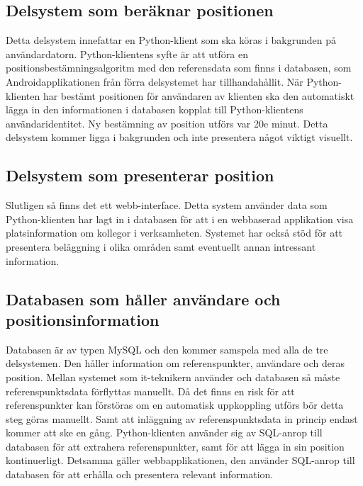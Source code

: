 \documentclass[swedish, a4paper,12pt]{article}
\begin{document}
\subsection{Delsystem som beräknar positionen}
Detta delsystem innefattar en Python-klient som ska köras i bakgrunden på användardatorn. Python-klientens syfte är att utföra en positionsbestämningsalgoritm med den referensdata som finns i databasen, som Androidapplikationen från förra delsystemet har tillhandahållit. När Python-klienten har bestämt positionen för användaren av klienten ska den automatiskt lägga in den informationen i databasen kopplat till Python-klientens användaridentitet. Ny bestämning av position utförs var 20e minut. Detta delsystem kommer ligga i bakgrunden och inte presentera något viktigt visuellt.

\subsection{Delsystem som presenterar position}
Slutligen så finns det ett webb-interface. Detta system använder data som Python-klienten har lagt in i databasen för att i en webbaserad applikation visa platsinformation om kollegor i verksamheten. Systemet har också stöd för att presentera beläggning i olika områden samt eventuellt annan intressant information.

\subsection{Databasen som håller användare och positionsinformation}
Databasen är av typen MySQL och den kommer samspela med alla de tre delsystemen. Den håller information om referenspunkter, användare och deras position.
Mellan systemet som it-teknikern använder och databasen så måste referenspunktsdata förflyttas manuellt. Då det finns en risk för att referenspunkter kan förstöras om en automatisk uppkoppling utförs bör detta steg göras manuellt. Samt att inläggning av referenspunktsdata in princip endast kommer att ske en gång. Python-klienten använder sig av SQL-anrop till databasen för att extrahera referenspunkter, samt för att lägga in sin position kontinuerligt. Detsamma gäller webbapplikationen, den använder SQL-anrop till databasen för att erhålla och presentera relevant information.
\end{document}
